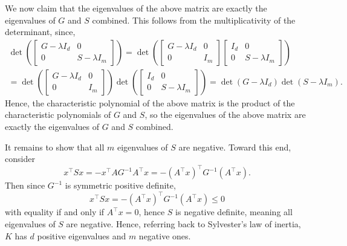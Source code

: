 \documentclass{../kin_math}
\begin{document}
\begin{questions}
\begin{solution}
    We now claim that the eigenvalues of the above matrix are exactly the eigenvalues of $G$ and $S$ combined. This follows from the multiplicativity of the determinant, since,
    \begin{multline*}
      \det\left(\begin{bmatrix} G - \lambda I_d & 0 \\ 0 & S - \lambda I_m \end{bmatrix}\right) = \det\left(\begin{bmatrix} G - \lambda I_d & 0 \\ 0 & I_m \end{bmatrix} \begin{bmatrix} I_d & 0 \\ 0 & S - \lambda I_m \end{bmatrix}\right) \\
      = \det\left(\begin{bmatrix} G - \lambda I_d & 0 \\ 0 & I_m \end{bmatrix}\right) \det\left(\begin{bmatrix} I_d & 0 \\ 0 & S - \lambda I_m \end{bmatrix}\right) = \det\left(G - \lambda I_d\right) \det\left(S - \lambda I_m\right).
    \end{multline*}
    Hence, the characteristic polynomial of the above matrix is the product of the characteristic polynomials of $G$ and $S$, so the eigenvalues of the above matrix are exactly the eigenvalues of $G$ and $S$ combined.

    It remains to show that all $m$ eigenvalues of $S$ are negative. Toward this end, consider
    \begin{equation*}
      x^\top S x = -x^\top AG^{-1} A^\top x = -(A^\top x)^\top G^{-1} (A^\top x).
    \end{equation*}
    Then since $G^{-1}$ is symmetric positive definite,
    \begin{equation*}
      x^\top S x = -(A^\top x)^\top G^{-1} (A^\top x) \leq 0
    \end{equation*}
    with equality if and only if $A^\top x = 0$, hence $S$ is negative definite, meaning all eigenvalues of $S$ are negative. Hence, referring back to Sylvester's law of inertia, $K$ has $d$ positive eigenvalues and $m$ negative ones.
  \end{solution}


\end{questions}
\end{document}
